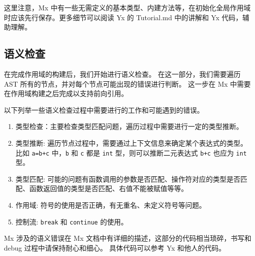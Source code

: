 这里注意，Mx 中有一些无需定义的基本类型、内建方法等，在初始化全局作用域时应该先行保存。更多细节可以阅读 Yx 的 Tutorial.md 中的讲解和 Yx 代码，辅助理解。

\subsection{语义检查}
在完成作用域的构建后，我们开始进行语义检查。
在这一部分，我们需要遍历 AST 所有的节点，并对每个节点可能出现的错误进行判断。
这一步在 Mx 中需要在作用域构建之后完成以支持前向引用。

以下列举一些语义检查过程中需要进行的工作和可能遇到的错误。

\begin{enumerate}
    \item 类型检查：主要检查类型匹配问题，遍历过程中需要进行一定的类型推断。
    \item 类型推断: 遍历节点过程中，需要通过上下文信息来确定某个表达式的类型。比如 \texttt{a=b+c}
      中，\texttt{b} 和 \texttt{c} 都是 \texttt{int} 型，则可以推断二元表达式 \texttt{b+c} 也应为 \texttt{int} 型。
    \item 类型匹配: 可能的问题有函数调用的参数是否匹配、操作符对应的类型是否匹配、函数返回值的类型是否匹配、右值不能被赋值等等。
    \item 作用域: 符号的使用是否正确，有无重名、未定义符号等问题。
    \item 控制流: \texttt{break} 和 \texttt{continue} 的使用。
\end{enumerate}


Mx 涉及的语义错误在 Mx 文档中有详细的描述，这部分的代码相当琐碎，书写和 debug 过程中请保持耐心和细心。
具体代码可以参考 Yx 和他人的代码。

